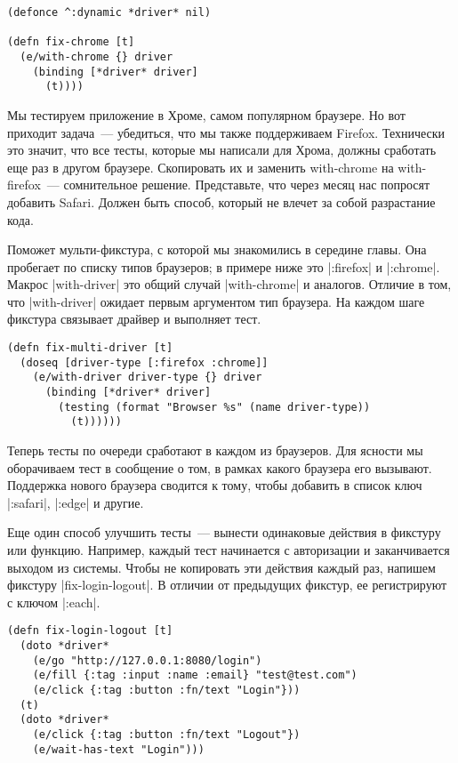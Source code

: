 \begin{verbatim}
(defonce ^:dynamic *driver* nil)

(defn fix-chrome [t]
  (e/with-chrome {} driver
    (binding [*driver* driver]
      (t))))
\end{verbatim}

Мы тестируем приложение в Хроме, самом популярном браузере. Но вот приходит
задача~--- убедиться, что мы также поддерживаем Firefox. Технически это значит,
что все тесты, которые мы написали для Хрома, должны сработать еще раз в другом
браузере. Скопировать их и заменить with-chrome на with-firefox~--- сомнительное
решение. Представьте, что через месяц нас попросят добавить Safari. Должен быть
способ, который не влечет за собой разрастание кода.

Поможет мульти-фикстура, с которой мы знакомились в середине главы. Она
пробегает по списку типов браузеров; в примере ниже это \spverb|:firefox| и
\spverb|:chrome|. Макрос \spverb|with-driver| это общий случай \spverb|with-chrome| и
аналогов. Отличие в том, что \spverb|with-driver| ожидает первым аргументом тип
браузера. На каждом шаге фикстура связывает драйвер и выполняет тест.

\begin{verbatim}
(defn fix-multi-driver [t]
  (doseq [driver-type [:firefox :chrome]]
    (e/with-driver driver-type {} driver
      (binding [*driver* driver]
        (testing (format "Browser %s" (name driver-type))
          (t))))))
\end{verbatim}

Теперь тесты по очереди сработают в каждом из браузеров. Для ясности мы
оборачиваем тест в сообщение о том, в рамках какого браузера его
вызывают. Поддержка нового браузера сводится к тому, чтобы добавить в список
ключ \spverb|:safari|, \spverb|:edge| и другие.

Еще один способ улучшить тесты~--- вынести одинаковые действия в фикстуру или
функцию. Например, каждый тест начинается с авторизации и заканчивается выходом
из системы. Чтобы не копировать эти действия каждый раз, напишем фикстуру
\spverb|fix-login-logout|. В отличии от предыдущих фикстур, ее регистрируют с ключом
\spverb|:each|.

\begin{verbatim}
(defn fix-login-logout [t]
  (doto *driver*
    (e/go "http://127.0.0.1:8080/login")
    (e/fill {:tag :input :name :email} "test@test.com")
    (e/click {:tag :button :fn/text "Login"}))
  (t)
  (doto *driver*
    (e/click {:tag :button :fn/text "Logout"})
    (e/wait-has-text "Login")))
\end{verbatim}

